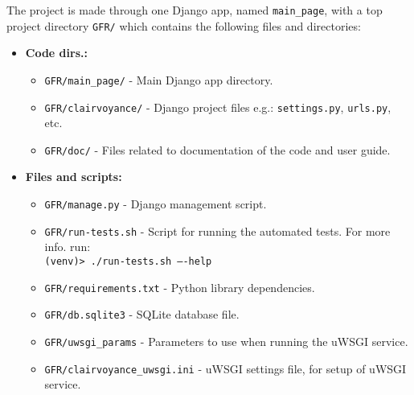 \documentclass{article}
\begin{document}
The project is made through one Django app, named \texttt{main\_page}, with a top project directory \texttt{GFR/} which contains the following files and directories:
\begin{itemize}
	\item \textbf{Code dirs.:}
	\begin{itemize}
		\item \texttt{GFR/main\_page/} - Main Django app directory.
		\item \texttt{GFR/clairvoyance/} - Django project files e.g.: \texttt{settings.py},  \texttt{urls.py}, etc.
		\item \texttt{GFR/doc/} - Files related to documentation of the code and user guide.
	\end{itemize}
	\item \textbf{Files and scripts:}
	\begin{itemize}
		\item \texttt{GFR/manage.py} - Django management script.
		\item \texttt{GFR/run-tests.sh} - Script for running the automated tests. For more info. run:\\ \texttt{(venv)> ./run-tests.sh ----help}
		\item \texttt{GFR/requirements.txt} - Python library dependencies.
		\item \texttt{GFR/db.sqlite3} - SQLite database file.
		\item \texttt{GFR/uwsgi\_params} - Parameters to use when running the uWSGI service.
		\item \texttt{GFR/clairvoyance\_uwsgi.ini} - uWSGI settings file, for setup of uWSGI service. 
	\end{itemize}
\end{itemize}
\end{document}
